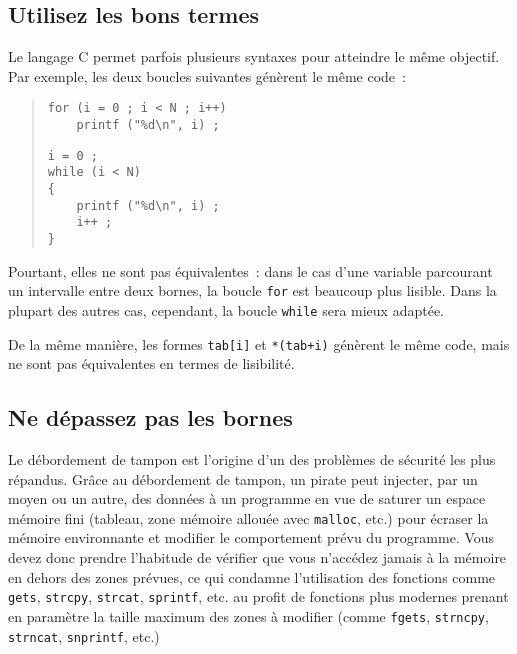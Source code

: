 \documentclass {article}
\begin{document}
\subsection {Utilisez les bons termes}

Le langage C permet parfois plusieurs syntaxes pour atteindre le même
objectif. Par exemple, les deux boucles suivantes génèrent le même
code~:

\begin {quote}
\begin {minipage} {.4\textwidth}
\begin {lstlisting}
for (i = 0 ; i < N ; i++)
    printf ("%
\end{lstlisting}
\end {minipage}
\hfill
\begin {minipage} {.4\textwidth}
\begin {lstlisting}
i = 0 ;
while (i < N)
{
    printf ("%
    i++ ;
}
\end{lstlisting}
\end {minipage}
\end {quote}

Pourtant, elles ne sont pas équivalentes~: dans le cas d'une variable
parcourant un intervalle entre deux bornes, la boucle \texttt {for}
est beaucoup plus lisible. Dans la plupart des autres cas, cependant,
la boucle \texttt {while} sera mieux adaptée.

De la même manière, les formes \texttt {tab[i]} et \texttt {*(tab+i)}
génèrent le même code, mais ne sont pas équivalentes en termes
de lisibilité.


\subsection {Ne dépassez pas les bornes}

Le débordement de tampon est l'origine d'un des problèmes de sécurité
les plus répandus. Grâce au débordement de tampon, un pirate peut
injecter, par un moyen ou un autre, des données à un programme en vue
de saturer un espace mémoire fini (tableau, zone mémoire allouée avec
\texttt {malloc}, etc.) pour écraser la mémoire environnante et modifier
le comportement prévu du programme.  Vous devez donc prendre l'habitude
de vérifier que vous n'accédez jamais à la mémoire en dehors des
zones prévues, ce qui condamne l'utilisation des fonctions comme
\texttt {gets}, \texttt {strcpy}, \texttt {strcat}, \texttt {sprintf},
etc. au profit de fonctions plus modernes prenant en paramètre la taille
maximum des zones à modifier (comme \texttt {fgets}, \texttt {strncpy},
\texttt {strncat}, \texttt {snprintf}, etc.)
\end{document}
